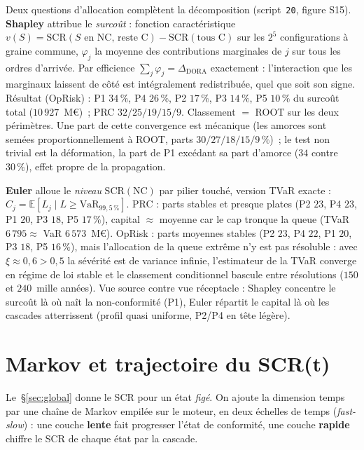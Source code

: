 \documentclass[11pt,a4paper]{article}
\begin{document}
Deux questions d'allocation complètent la décomposition (script~\texttt{20}, figure S15).
\textbf{Shapley} attribue le \emph{surcoût} : fonction caractéristique
$v(S) = \mathrm{SCR}(S \text{ en NC, reste C}) - \mathrm{SCR}(\text{tous C})$ sur les $2^5$
configurations à graine commune, $\varphi_j$ la moyenne des contributions marginales de $j$
sur tous les ordres d'arrivée. Par efficience $\sum_j \varphi_j = \Delta_{\text{DORA}}$
exactement : l'interaction que les marginaux laissent de côté est intégralement redistribuée,
quel que soit son signe. Résultat (OpRisk) : P1 $34\,\%$, P4 $26\,\%$, P2 $17\,\%$,
P3 $14\,\%$, P5 $10\,\%$ du surcoût total ($10\,927$~M\euro)~; PRC $32/25/19/15/9$.
Classement $=$ ROOT sur les deux périmètres. Une part de cette convergence est mécanique
(les amorces sont semées proportionnellement à ROOT, parts $30/27/18/15/9\,\%$)~; le test non
trivial est la déformation, la part de P1 excédant sa part d'amorce ($34$ contre $30\,\%$),
effet propre de la propagation.

\textbf{Euler} alloue le \emph{niveau} $\mathrm{SCR}(\text{NC})$ par pilier touché, version
TVaR exacte : $C_j = \mathbb{E}[L_j \mid L \ge \mathrm{VaR}_{99{,}5\,\%}]$. PRC : parts
stables et presque plates (P2 $23$, P4 $23$, P1 $20$, P3 $18$, P5 $17\,\%$), capital
$\approx$ moyenne car le cap tronque la queue (TVaR $6\,795 \approx$ VaR $6\,573$~M\euro).
OpRisk : parts moyennes stables (P2 $23$, P4 $22$, P1 $20$, P3 $18$, P5 $16\,\%$), mais
l'allocation de la queue extrême n'y est pas résoluble : avec $\xi \approx 0{,}6 > 0{,}5$ la
sévérité est de variance infinie, l'estimateur de la TVaR converge en régime de loi stable et
le classement conditionnel bascule entre résolutions ($150$ et $240$~mille années). Vue
source contre vue réceptacle : Shapley concentre le surcoût là où naît la non-conformité
(P1), Euler répartit le capital là où les cascades atterrissent (profil quasi uniforme,
P2/P4 en tête légère).

\section{Markov et trajectoire du SCR(t)}
\label{sec:markov}

Le~\S\ref{sec:global} donne le SCR pour un état \emph{figé}. On ajoute la dimension temps par
une chaîne de Markov empilée sur le moteur, en deux échelles de temps (\emph{fast-slow}) : une
couche \textbf{lente} fait progresser l'état de conformité, une couche \textbf{rapide} chiffre
le SCR de chaque état par la cascade.
\end{document}
